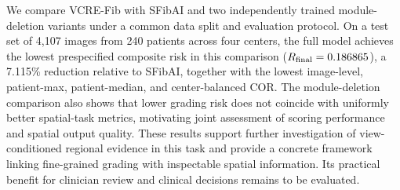 We compare VCRE-Fib with SFibAI and two independently trained module-deletion variants under a common data split and evaluation protocol. On a test set of 4,107 images from 240 patients across four centers, the full model achieves the lowest prespecified composite risk in this comparison ($R_{\mathrm{final}}=0.186865$), a 7.115\% reduction relative to SFibAI, together with the lowest image-level, patient-max, patient-median, and center-balanced COR. The module-deletion comparison also shows that lower grading risk does not coincide with uniformly better spatial-task metrics, motivating joint assessment of scoring performance and spatial output quality. These results support further investigation of view-conditioned regional evidence in this task and provide a concrete framework linking fine-grained grading with inspectable spatial information. Its practical benefit for clinician review and clinical decisions remains to be evaluated.
